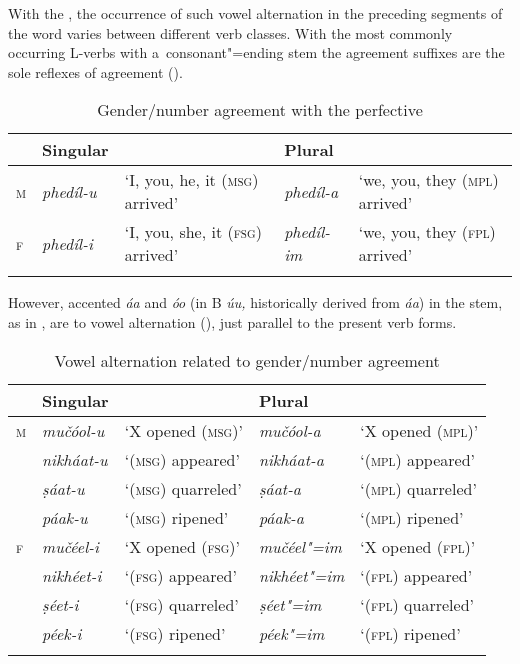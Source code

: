 With the , the occurrence of such vowel alternation in the preceding segments of the word varies between different verb classes. With the most commonly occurring L-verbs with a~consonant"=ending stem the agreement suffixes are the sole reflexes of agreement ().


\begin{table}[p]
\caption{Gender/number agreement with the perfective}

\begin{tabularx}{\textwidth}{ l l Q l Q }
\lsptoprule
&
Singular &
&
Plural &
\\\midrule
\textsc{m} &
\textit{phedíl-u} &
`I, you, he, it (\textsc{msg}) arrived' &
\textit{phedíl-a} &
`we, you, they (\textsc{mpl}) arrived'\\
\textsc{f} &
\textit{phedíl-i} &
`I, you, she, it (\textsc{fsg}) arrived' &
\textit{phedíl-im} &
`we, you, they (\textsc{fpl}) arrived'\\\lspbottomrule
\end{tabularx}
\label{tab:8-19}
\end{table}


However, accented \textit{áa} and \textit{óo} (in B \textit{úu,} historically derived from \textit{áa}) in the  stem, as in , are  to vowel alternation (), just parallel to the present verb forms. 


\begin{table}[p]
\caption{Vowel alternation related to {gender}/number agreement}

\begin{tabularx}{\textwidth}{ l l@{\hspace{20pt}} l@{\hspace{20pt}} l@{\hspace{20pt}} l@{\hspace{20pt}} }
\lsptoprule
&
Singular &
&
Plural &
\\\midrule
\textsc{m} &
\textit{mučóol-u} &
`X opened (\textsc{msg})' &
\textit{mučóol-a} &
`X opened (\textsc{mpl})'\\
&
\textit{nikháat-u} &
`(\textsc{msg}) appeared' &
\textit{nikháat-a} &
`(\textsc{mpl}) appeared'\\
&
\textit{ṣáat-u} &
`(\textsc{msg}) quarreled' &
\textit{ṣáat-a} &
`(\textsc{mpl}) quarreled'\\
&
\textit{páak-u} &
`(\textsc{msg}) ripened' &
\textit{páak-a} &
`(\textsc{mpl}) ripened'\\
\textsc{f} &
\textit{mučéel-i} &
`X opened (\textsc{fsg})' &
\textit{mučéel"=im} &
`X opened (\textsc{fpl})'\\
&
\textit{nikhéet-i} &
`(\textsc{fsg}) appeared' &
\textit{nikhéet"=im} &
`(\textsc{fpl}) appeared'\\
&
\textit{ṣéet-i} &
`(\textsc{fsg}) quarreled' &
\textit{ṣéet"=im} &
`(\textsc{fpl}) quarreled'\\
&
\textit{péek-i} &
`(\textsc{fsg}) ripened' &
\textit{péek"=im} &
`(\textsc{fpl}) ripened'\\\lspbottomrule
\end{tabularx}
\label{tab:8-20}
\end{table}


